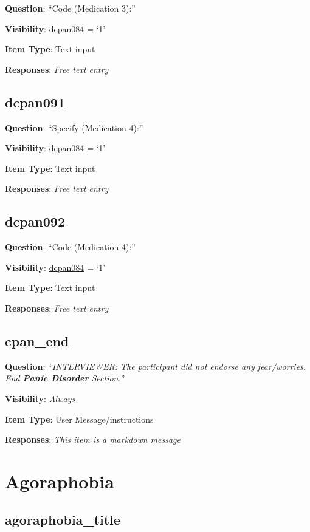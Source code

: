 \documentclass[]{book}
\begin{document}
\textbf{Question}: ``Code (Medication 3):''

\textbf{Visibility}: \protect\hyperlink{dcpan084}{dcpan084} = `1'

\textbf{Item Type}: Text input

\textbf{Responses}: \emph{Free text entry}

\hypertarget{dcpan091}{%
\section{dcpan091}\label{dcpan091}}

\textbf{Question}: ``Specify (Medication 4):''

\textbf{Visibility}: \protect\hyperlink{dcpan084}{dcpan084} = `1'

\textbf{Item Type}: Text input

\textbf{Responses}: \emph{Free text entry}

\hypertarget{dcpan092}{%
\section{dcpan092}\label{dcpan092}}

\textbf{Question}: ``Code (Medication 4):''

\textbf{Visibility}: \protect\hyperlink{dcpan084}{dcpan084} = `1'

\textbf{Item Type}: Text input

\textbf{Responses}: \emph{Free text entry}

\hypertarget{cpan_end}{%
\section{cpan\_end}\label{cpan_end}}

\textbf{Question}: ``\emph{INTERVIEWER: The participant did not endorse any fear/worries. End \textbf{Panic Disorder} Section.}''

\textbf{Visibility}: \emph{Always}

\textbf{Item Type}: User Message/instructions

\textbf{Responses}: \emph{This item is a markdown message}

\hypertarget{agoraphobia_section}{%
\chapter{Agoraphobia}\label{agoraphobia_section}}

\hypertarget{agoraphobia_title}{%
\section{agoraphobia\_title}\label{agoraphobia_title}}
\end{document}
